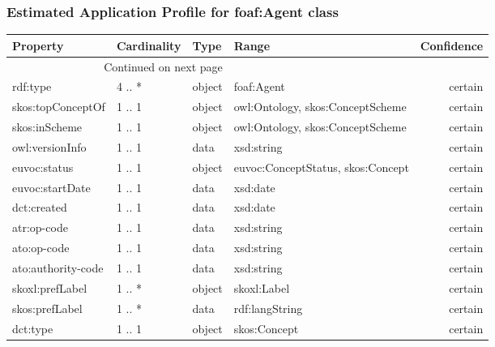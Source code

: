 \documentclass[10pt,a4paper,titlepage,final]{article}
\begin{document}
\subsubsection{Estimated Application Profile for foaf:Agent class}
\begin{tabularx}{\textwidth}{lllXr}
\toprule
               Property & Cardinality &    Type &                                              Range & Confidence \\
\midrule
\endhead
\midrule
\multicolumn{3}{r}{{Continued on next page}} \\
\midrule
\endfoot

\bottomrule
\endlastfoot
               rdf:type &      4 .. * &  object &                                         foaf:Agent &    certain \\
      skos:topConceptOf &      1 .. 1 &  object &                   owl:Ontology, skos:ConceptScheme &    certain \\
          skos:inScheme &      1 .. 1 &  object &                   owl:Ontology, skos:ConceptScheme &    certain \\
        owl:versionInfo &      1 .. 1 &    data &                                         xsd:string &    certain \\
           euvoc:status &      1 .. 1 &  object &                  euvoc:ConceptStatus, skos:Concept &    certain \\
        euvoc:startDate &      1 .. 1 &    data &                                           xsd:date &    certain \\
            dct:created &      1 .. 1 &    data &                                           xsd:date &    certain \\
            atr:op-code &      1 .. 1 &    data &                                         xsd:string &    certain \\
            ato:op-code &      1 .. 1 &    data &                                         xsd:string &    certain \\
     ato:authority-code &      1 .. 1 &    data &                                         xsd:string &    certain \\
        skoxl:prefLabel &      1 .. * &  object &                                        skoxl:Label &    certain \\
         skos:prefLabel &      1 .. * &    data &                                     rdf:langString &    certain \\
               dct:type &      1 .. 1 &  object &                                       skos:Concept &    certain \\

\end{tabularx}
\end{document}
